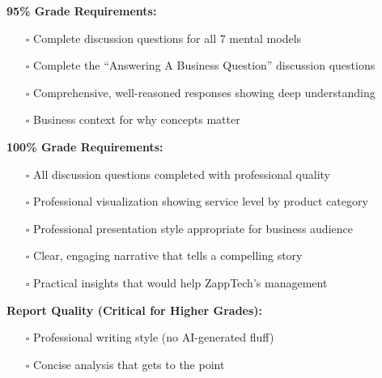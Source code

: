 \documentclass[
  letterpaper,
  DIV=11,
  numbers=noendperiod]{scrartcl}
\providecommand{\tightlist}{%
  \setlength{\itemsep}{0pt}\setlength{\parskip}{0pt}}
\begin{document}
\textbf{95\% Grade Requirements:}

\begin{itemize}
\tightlist
\item[$\square$]
  Complete discussion questions for all 7 mental models
\item[$\square$]
  Complete the ``Answering A Business Question'' discussion questions
\item[$\square$]
  Comprehensive, well-reasoned responses showing deep understanding
\item[$\square$]
  Business context for why concepts matter
\end{itemize}

\textbf{100\% Grade Requirements:}

\begin{itemize}
\tightlist
\item[$\square$]
  All discussion questions completed with professional quality
\item[$\square$]
  Professional visualization showing service level by product category
\item[$\square$]
  Professional presentation style appropriate for business audience
\item[$\square$]
  Clear, engaging narrative that tells a compelling story
\item[$\square$]
  Practical insights that would help ZappTech's management
\end{itemize}

\textbf{Report Quality (Critical for Higher Grades):}

\begin{itemize}
\tightlist
\item[$\square$]
  Professional writing style (no AI-generated fluff)
\item[$\square$]
  Concise analysis that gets to the point
\end{itemize}
\end{document}
